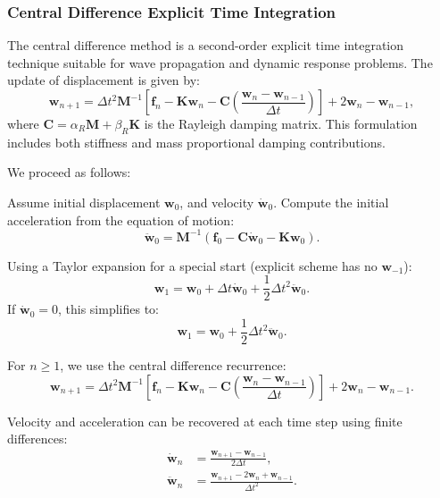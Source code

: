 \documentclass{article}
\begin{document}
	
	\subsubsection{Central Difference Explicit Time Integration}
	
	The central difference method is a second-order explicit time integration technique suitable for wave propagation and dynamic response problems. The update of displacement is given by:
	\begin{equation}
		\mathbf{w}_{n+1} = \Delta t^2 \mathbf{M}^{-1} \left[ \mathbf{f}_n - \mathbf{K} \mathbf{w}_n - \mathbf{C} \left( \frac{\mathbf{w}_n - \mathbf{w}_{n-1}}{\Delta t} \right) \right] + 2\mathbf{w}_n - \mathbf{w}_{n-1},
	\end{equation}
	where \( \mathbf{C} = \alpha_R \mathbf{M} + \beta_R \mathbf{K} \) is the Rayleigh damping matrix. This formulation includes both stiffness and mass proportional damping contributions.
	
	We proceed as follows:
	

	Assume initial displacement \( \mathbf{w}_0 \), and velocity \( \dot{\mathbf{w}}_0 \). Compute the initial acceleration from the equation of motion:
	\begin{equation}
		\ddot{\mathbf{w}}_0 = \mathbf{M}^{-1} \left( \mathbf{f}_0 - \mathbf{C} \dot{\mathbf{w}}_0 - \mathbf{K} \mathbf{w}_0 \right).
	\end{equation}
	
Using a Taylor expansion for a special start (explicit scheme has no \( \mathbf{w}_{-1} \)):
	\begin{equation}
		\mathbf{w}_1 = \mathbf{w}_0 + \Delta t \dot{\mathbf{w}}_0 + \frac{1}{2} \Delta t^2 \ddot{\mathbf{w}}_0.
	\end{equation}
	If \( \dot{\mathbf{w}}_0 = 0 \), this simplifies to:
	\begin{equation}
		\mathbf{w}_1 = \mathbf{w}_0 + \frac{1}{2} \Delta t^2 \ddot{\mathbf{w}}_0.
	\end{equation}
	
For \( n \geq 1 \), we use the central difference recurrence:
	\begin{equation}
		\mathbf{w}_{n+1} = \Delta t^2 \mathbf{M}^{-1} \left[ \mathbf{f}_n - \mathbf{K} \mathbf{w}_n - \mathbf{C} \left( \frac{\mathbf{w}_n - \mathbf{w}_{n-1}}{\Delta t} \right) \right] + 2\mathbf{w}_n - \mathbf{w}_{n-1}.
	\end{equation}
	
Velocity and acceleration can be recovered at each time step using finite differences:
	\begin{align}
		\dot{\mathbf{w}}_n &= \frac{\mathbf{w}_{n+1} - \mathbf{w}_{n-1}}{2\Delta t}, \\
		\ddot{\mathbf{w}}_n &= \frac{\mathbf{w}_{n+1} - 2\mathbf{w}_n + \mathbf{w}_{n-1}}{\Delta t^2}.
	\end{align}
	
\end{document}
